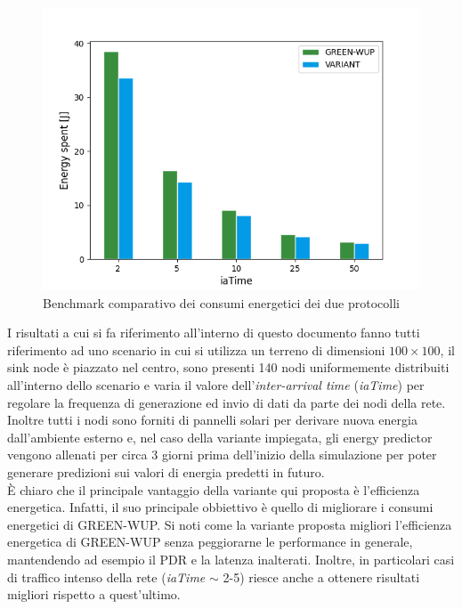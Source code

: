 \documentclass{report}
\begin{document}
\begin{figure}
    \begin{center}
        \includegraphics[scale=0.5]{energy_plot.png}
        \caption{Benchmark comparativo dei consumi energetici dei due protocolli}
    \end{center}
\end{figure}

I risultati a cui si fa riferimento all'interno di questo documento fanno tutti riferimento ad uno scenario in cui si utilizza un terreno di dimensioni
$100 \times 100$, il sink node è piazzato nel centro, sono presenti 140 nodi uniformemente distribuiti all'interno dello scenario e varia il valore
dell'\emph{inter-arrival time} (\emph{iaTime}) per regolare la frequenza di generazione ed invio di dati da parte dei nodi della rete. Inoltre tutti
i nodi sono forniti di pannelli solari per derivare nuova energia dall'ambiente esterno e, nel caso della variante impiegata, gli energy predictor
vengono allenati per circa 3 giorni prima dell'inizio della simulazione per poter generare predizioni sui valori di energia predetti in futuro.\\

È chiaro che il principale vantaggio della variante qui proposta è l'efficienza energetica. Infatti, il suo principale obbiettivo è quello di migliorare i consumi
energetici di GREEN-WUP. Si noti come la variante proposta migliori l'efficienza energetica di GREEN-WUP senza peggiorarne le performance in generale,
mantendendo ad esempio il PDR e la latenza inalterati. Inoltre, in particolari casi di traffico intenso della rete (\emph{iaTime} $\sim$ 2-5) riesce anche a
ottenere risultati migliori rispetto a quest'ultimo.
\end{document}
